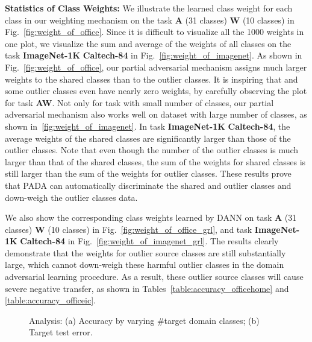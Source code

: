 \documentclass[runningheads]{llncs}
\begin{document}
\textbf{Statistics of Class Weights:} We illustrate the learned class weight for each class in our weighting mechanism on the task \textbf{A} (31 classes)  \textbf{W} (10 classes) in Fig.~\ref{fig:weight_of_office}. Since it is difficult to visualize all the 1000 weights in one plot, we visualize the sum and average of the weights of all classes on the task \textbf{ImageNet-1K}  \textbf{Caltech-84} in Fig.~\ref{fig:weight_of_imagenet}. As shown in Fig.~\ref{fig:weight_of_office}, our partial adversarial mechanism assigns much larger weights to the shared classes than to the outlier classes. It is inspiring that and some outlier classes even have nearly zero weights, by carefully observing the plot for task \textbf{A}\textbf{W}. Not only for task with small number of classes, our partial adversarial mechanism also works well on dataset with large number of classes, as shown in~\ref{fig:weight_of_imagenet}. In task \textbf{ImageNet-1K}  \textbf{Caltech-84}, the average weights of the shared classes are significantly larger than those of the outlier classes. Note that even though the number of the outlier classes is much larger than that of the shared classes, the sum of the weights for shared classes is still larger than the sum of the weights for outlier classes. These results prove that PADA can automatically discriminate the shared and outlier classes and down-weigh the outlier classes data. 

We also show the corresponding class weights learned by DANN on task \textbf{A} (31 classes)  \textbf{W} (10 classes) in Fig.~\ref{fig:weight_of_office_grl}, and task \textbf{ImageNet-1K}  \textbf{Caltech-84} in Fig.~\ref{fig:weight_of_imagenet_grl}. The results clearly demonstrate that the weights for outlier source classes are still substantially large, which cannot down-weigh these harmful outlier classes in the domain adversarial learning procedure. As a result, these outlier source classes will cause severe negative transfer, as shown in Tables~\ref{table:accuracy_officehome} and \ref{table:accuracy_officeic}.

\begin{figure}[!htbp]
  \centering
  \hfil
  \caption{Analysis: (a) Accuracy by varying \#target domain classes; (b) Target test error.}
\end{figure}
\end{document}
